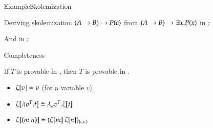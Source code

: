 \documentclass[9pt]{beamer}
\begin{document}
\begin{frame}{Example}{Skolemization}

Deriving skolemization $(A \imp B) \imp P(c)$ from $(A \imp B) \imp \ex x. P(x)$ in {\NDd}:

\begin{footnotesize}
\begin{prooftree}
		 
\end{prooftree}
\end{footnotesize}

\medskip
\medskip
\medskip
And in {\ND}:

\begin{footnotesize}
\begin{prooftree}
			 
		 
	 
\end{prooftree}
\end{footnotesize}
\end{frame}


\begin{frame}{Completeness}

\begin{theorem}[Completeness]
\label{theorem:Completeness}
If $T$ is provable in \ND, then $T$ is provable in \NDd.
\end{theorem}

\begin{definition}
\begin{itemize}
\item $\tN{v} \defEq v$ (for a variable $v$).
%
\item $\tN{\lambda v^T. t} \defEq \lambda_{\eS} v^T. \tN{t}$ 
\item $\tN{(m \ n)} \defEq (\tN{m} \ \tN{n})_{(\eS;\eS)}$
\end{itemize}
\end{definition}
\end{frame}
\end{document}
